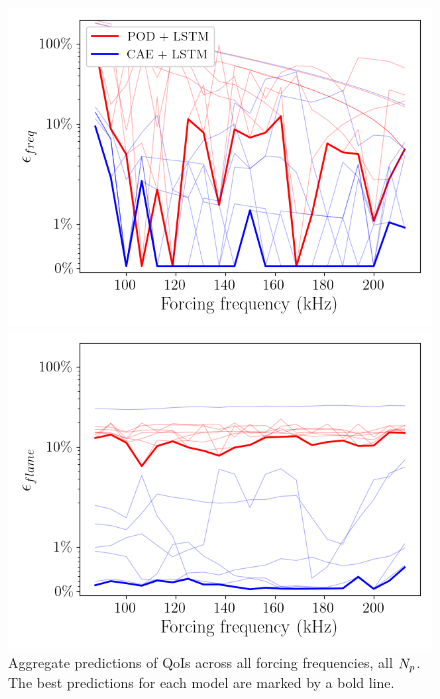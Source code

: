 \begin{figure}
    \begin{minipage}{0.49\linewidth}
        \includegraphics[width=0.99\linewidth]{Chapters/TransientFlame/Images/lstm/freq_err.png}
    \end{minipage}
    \begin{minipage}{0.49\linewidth}
        \includegraphics[width=0.99\linewidth]{Chapters/TransientFlame/Images/lstm/err_flame.png}
    \end{minipage}
    \caption{\label{fig:flameFreqFlameErr}Aggregate predictions of QoIs across all forcing frequencies, all $N_p$. The best predictions for each model are marked by a bold line.}
\end{figure}

